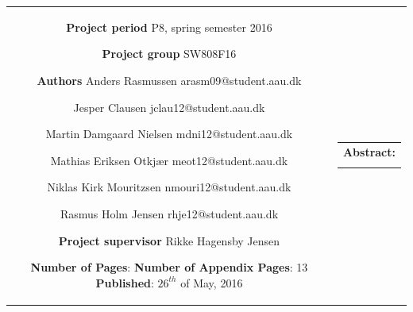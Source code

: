 \begin{nopagebreak}
{\begin{tabular}{cc}
{        \textbf{Project period} \\ 
        P8, spring semester 2016 \\

        \textbf{Project group} \\
        SW808F16 \\

        \textbf{Authors} \\
        Anders Rasmussen\\
        arasm09@student.aau.dk
        \\\\ 
        Jesper Clausen\\
        jclau12@student.aau.dk
        \\\\ 
        Martin Damgaard Nielsen\\
        mdni12@student.aau.dk
        \\\\ 
        Mathias Eriksen Otkjær\\
        meot12@student.aau.dk
        \\\\ 
        Niklas Kirk Mouritzsen\\
        nmouri12@student.aau.dk
        \\\\ 
        Rasmus Holm Jensen\\
        rhje12@student.aau.dk
        \\\\
        \textbf{Project supervisor} \\ 
        Rikke Hagensby Jensen \\

        \textbf{Number of Pages}: \pageref{LastPage} \\
        \textbf{Number of Appendix Pages}: 13 \\
        \textbf{Published}: $26^{th}$ of May, 2016 \\

        \vfill 

        } &
    \parbox{7cm}
    {
        \vspace{.15cm}
        \hfill 
        \begin{tabular}{l}
            {\bf Abstract:}\bigskip \\
            \fbox{
                \parbox{7cm}
                {
                    \bigskip
                    {\vfill{\small \bigskip}}
                }
            }
        \end{tabular}
    }

\end{tabular}}
\begin{center}
\end{center}

\restoregeometry
\end{nopagebreak}